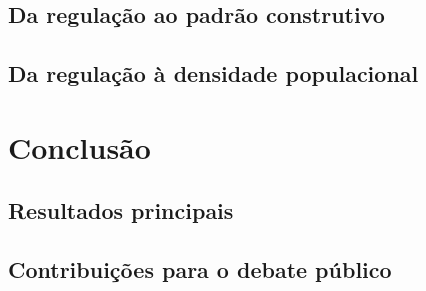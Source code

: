 \section{Da regulação ao padrão construtivo}
\label{sec:perg2}

\section{Da regulação à densidade populacional}
\label{sec:perg3}

\chapter{Conclusão}
\label{chp:conclusao}

\section{Resultados principais}
\label{sec:conclusao}

\section{Contribuições para o debate público}
\label{sec:contribuicoes}

